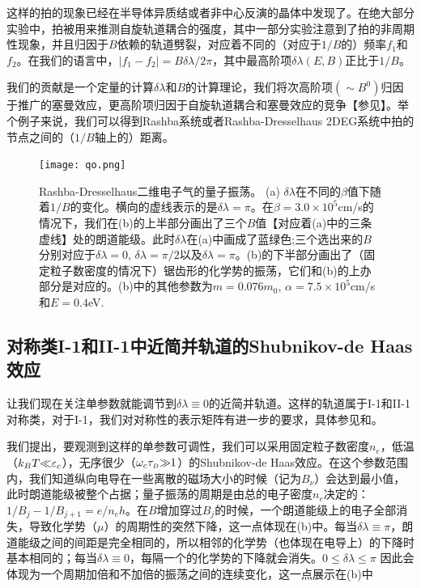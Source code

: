 这样的拍的现象已经在半导体异质结\cite{das_evidence_1989,hu_zero-field_1999,wilde_inversion-asymmetry-induced_2009}或者非中心反演的晶体\cite{terashima_fermi_2008,onuki_chiral-structure-driven_2014,maurya_splitting_2018}中发现了。在绝大部分实验中，拍被用来推测自旋轨道耦合的强度\cite{das_evidence_1989,onuki_chiral-structure-driven_2014,maurya_splitting_2018}，其中一部分实验\cite{das_evidence_1989}注意到了拍的非周期性现象，并且归因于$B$依赖的轨道劈裂，对应着不同的（对应于$1/B$的）频率$f_1$和$f_2$。在我们的语言中，$|f_1-f_2|=B\delta\lambda/2\pi$，其中最高阶项$\delta \lambda(E,B)$正比于$1/B$。

我们的贡献是一个定量的计算$\delta\lambda$和$B$的计算理论，我们将次高阶项$({\sim}B^0)$归因于推广的塞曼效应，更高阶项归因于自旋轨道耦合和塞曼效应的竞争【参见】。举个例子来说，我们可以得到Rashba系统或者Rashba-Dresselhaus 2DEG系统中拍的节点之间的（$1/B$轴上的）距离。


\begin{figure}
\texttt{[image: qo.png]}
\caption{Rashba-Dresselhaus二维电子气的量子振荡。 (a) $\delta\lambda$在不同的$\beta$值下随着$1/B$的变化。横向的虚线表示的是$\delta\lambda=\pi$。在$\beta=3.0\times 10^{5}$cm/s的情况下，我们在(b)的上半部分画出了三个$B$值【对应着(a)中的三条虚线】处的朗道能级。此时$\delta \lambda$在(a)中画成了蓝绿色;三个选出来的$B$分别对应于$\delta\lambda{=}0$, $\delta\lambda{=}\pi/2$以及$\delta\lambda{=}\pi$。(b)的下半部分画出了（固定粒子数密度的情况下）锯齿形的化学势的振荡，它们和(b)的上办部分是对应的。(b)中的其他参数为$m{=}0.076m_0$, $\alpha{=}7.5\times10^{5}$cm/s和$E=0.4$eV.
\label{fig:qo}}
\end{figure}

\subsection{对称类I-1和II-1中近简并轨道的Shubnikov-de Haas效应}\label{sec:quantosc_quasideg}

让我们现在关注单参数就能调节到$\delta \lambda{\equiv}0$的近简并轨道。这样的轨道属于I-1和II-1对称类，对于I-1，我们对对称性的表示矩阵有进一步的要求，具体参见和。

我们提出，要观测到这样的单参数可调性，我们可以采用固定粒子数密度$n_e$，低温（$k_BT{\ll}\varepsilon_c$），无序很少（$\omega_c\tau_{\scriptscriptstyle{D}}{\gg}1$）的Shubnikov-de Haas效应。在这个参数范围内，我们知道纵向电导在一些离散的磁场大小的时候（记为$B_{\nu}$）会达到最小值，此时朗道能级被整个占据\cite{vinter_resolution_1980}；量子振荡的周期是由总的电子密度$n_e$决定的：$1/B_j{-}1/B_{j+1}{=}e/n_eh$。在$B$增加穿过$B_j$的时候，一个朗道能级上的电子全部消失，导致化学势（$\mu$）的周期性的突然下降，这一点体现在(b)中。每当$\delta\lambda{\equiv}\pi$，朗道能级之间的间距是完全相同的，所以相邻的化学势（也体现在电导上）的下降时基本相同的；每当$\delta\lambda{\equiv}0$，每隔一个的化学势的下降就会消失\cite{bychkov_oscillatory_1984}。$0{\leq}\delta\lambda{\leq}{\pi}$ 因此会体现为一个周期加倍和不加倍的振荡之间的连续变化，这一点展示在(b)中

